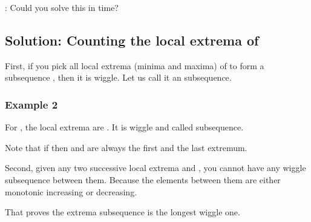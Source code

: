 \documentclass[letterpaper,12pt,english]{book}
\begin{document}
\sphinxAtStartPar
{}: Could you solve this in  time?


\subsection{Solution: Counting the local extrema of }
\label{\detokenize{Mathematics/09_MTH_376_Wiggle_Subsequence:solution-counting-the-local-extrema-of-nums}}
\sphinxAtStartPar
First, if you pick all local extrema (minima and maxima) of  to form a subsequence , then it is wiggle. Let us call it an  subsequence.


\subsubsection{Example 2}
\label{\detokenize{Mathematics/09_MTH_376_Wiggle_Subsequence:id1}}
\sphinxAtStartPar
For , the local extrema are \sphinxcode{\sphinxupquote{{[}1,17,5,15,5,16,8{]}}}. It is wiggle and called  subsequence.

\sphinxAtStartPar
Note that if  then  and  are always the first and the last extremum.

\sphinxAtStartPar
Second, given any two successive local extrema  and , you cannot have any wiggle subsequence between them. Because the elements between them are either monotonic increasing or decreasing.

\sphinxAtStartPar
That proves the extrema subsequence is the longest wiggle one.
\end{document}
